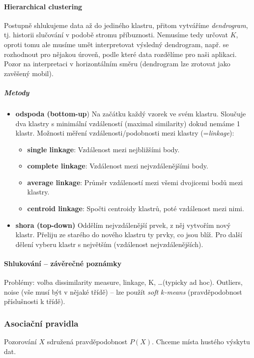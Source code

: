 \documentclass[11pt]{report} %
\numberwithin{equation}{section}
\begin{document}
\paragraph{Hierarchical clustering}
Postupně shlukujeme data až do jediného klastru, přitom vytváříme \textit{dendrogram}, tj. historii slučování v podobě stromu příbuznosti. Nemusíme tedy určovat $K$, oproti tomu ale musíme umět interpretovat výsledný dendrogram, např. se rozhodnout pro nějakou úroveň, podle které data rozdělíme pro naši aplikaci. Pozor na interpretaci v horizontálním směru (dendrogram lze zrotovat jako zavěšený mobil).

\subparagraph{Metody}
\begin{itemize}
	\item \textbf{odspoda (bottom-up}) Na začátku každý vzorek ve svém klastru. Sloučuje dva klastry s minimální vzdáleností (maximal similarity) dokud nemáme 1 klastr. Možnosti měření vzdálenosti/podobnosti mezi klastry (=\textit{linkage}):
	\begin{itemize}
		\item \textbf{single linkage}: Vzdálenost mezi nejbližšími body.
		\item \textbf{complete linkage}: Vzdálenost mezi nejvzdálenějšími body.
		\item \textbf{average linkage}: Průměr vzdáleností mezi všemi dvojicemi bodů mezi klastry.
		\item \textbf{centroid linkage}: Spočti centroidy klastrů, poté vzdálenost mezi nimi.
	\end{itemize}
	
	\item \textbf{shora (top-down)}	Oddělím nejvzdálenější prvek, z něj vytvořím nový klastr. Přeliju ze starého do nového klastru ty prvky, co jsou blíž. Pro další dělení vyberu klastr s největším  (vzdálenost nejvzdálenějších).

\end{itemize}

\paragraph{Shlukování -- závěrečné poznámky}
Problémy: volba dissimilarity measure, linkage, K, \dots (typicky ad hoc). Outliers, noise (vše musí být v nějaké třídě) -- lze použít \textit{soft $k$-means} (pravděpodobnost příslušnosti k třídě).

\subsubsection{Asociační pravidla}
Pozorování $X$ sdružená pravděpodobnost $P(X)$. Chceme místa hustého výskytu dat. 
\end{document}
